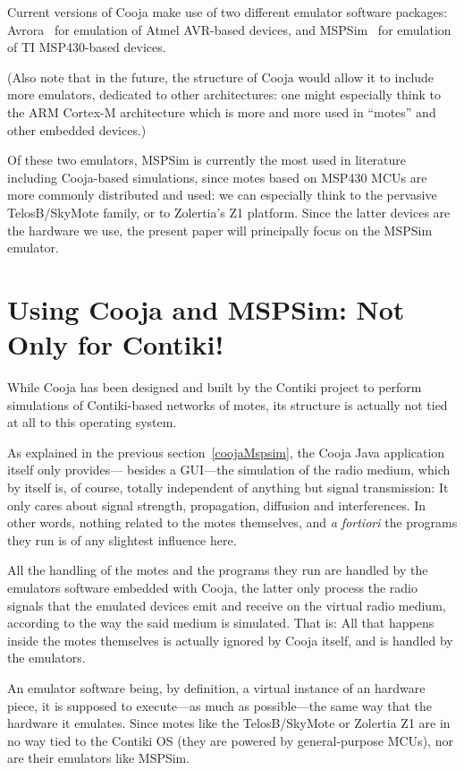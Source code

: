 \documentclass[10pt,emptycopyrightspace]{ewsn-proc}
\begin{document}
Current versions of Cooja make use of two different emulator software
packages: Avrora~\cite{Avrora} for emulation of Atmel AVR-based devices,
and MSPSim~\cite{MSPSim} for emulation of TI MSP430-based devices.

(Also note that in the future, the structure of Cooja would allow it
to include more emulators, dedicated to other architectures: one might
especially think to the ARM Cortex-M architecture which is more and
more used in ``motes'' and other embedded devices.)

Of these two emulators, MSPSim is currently the most used in literature
including Cooja-based simulations, since motes based on MSP430 MCUs are
more commonly distributed and used: we can especially think to the pervasive
TelosB/SkyMote family, or to Zolertia's Z1 platform. Since the latter
devices are the hardware we use, the present paper will principally
focus on the MSPSim emulator.



\section{Using Cooja and MSPSim: Not Only for Contiki!}
\label{newUses}

While Cooja has been designed and built by the Contiki project to perform
simulations of Contiki-based networks of motes, its structure is actually
not tied at all to this operating system.

As explained in the previous section~\ref{coojaMspsim}, the Cooja Java
application itself only provides--- besides a GUI---the simulation of the
radio medium, which by itself is, of course, totally independent of
anything but signal transmission: It only cares about signal strength,
propagation, diffusion and interferences. In other words, nothing related
to the motes themselves, and \textit{a fortiori} the programs they run
is of any slightest influence here.

All the handling of the motes and the programs they run are handled by
the emulators software embedded with Cooja, the latter only process the
radio signals that the emulated devices emit and receive on the virtual
radio medium, according to the way the said medium is simulated.
That is: All that happens inside the motes themselves is actually
ignored by Cooja itself, and is handled by the emulators.

An emulator software being, by definition, a virtual instance of an
hardware piece, it is supposed to execute---as much as possible---the
same way that the hardware it emulates. Since motes like the TelosB/SkyMote
or Zolertia Z1 are in no way tied to the Contiki OS (they are powered
by general-purpose MCUs), nor are their emulators like MSPSim.
\end{document}
